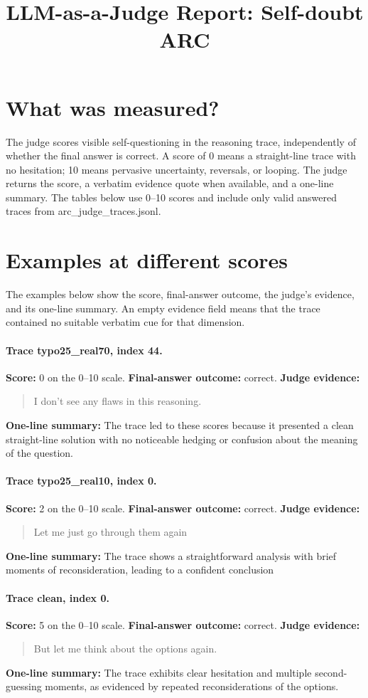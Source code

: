 \documentclass[11pt]{article}
\title{LLM-as-a-Judge Report: Self-doubt\\\large ARC}
\date{}
\begin{document}
\maketitle

\section*{What was measured?} The judge scores visible self-questioning in the reasoning trace, independently of whether the final answer is correct. A score of 0 means a straight-line trace with no hesitation; 10 means pervasive uncertainty, reversals, or looping. The judge returns the score, a verbatim evidence quote when available, and a one-line summary. The tables below use 0--10 scores and include only valid answered traces from arc\_judge\_traces.jsonl.

\section*{Examples at different scores} The examples below show the score, final-answer outcome, the judge's evidence, and its one-line summary. An empty evidence field means that the trace contained no suitable verbatim cue for that dimension.

\paragraph{Trace typo25\_real70, index 44.}
\textbf{Score:} 0 on the 0--10 scale. \textbf{Final-answer outcome:} correct.
\textbf{Judge evidence:} \begin{quote}I don't see any flaws in this reasoning.\end{quote}
\textbf{One-line summary:} The trace led to these scores because it presented a clean straight-line solution with no noticeable hedging or confusion about the meaning of the question.\medskip
\paragraph{Trace typo25\_real10, index 0.}
\textbf{Score:} 2 on the 0--10 scale. \textbf{Final-answer outcome:} correct.
\textbf{Judge evidence:} \begin{quote}Let me just go through them again\end{quote}
\textbf{One-line summary:} The trace shows a straightforward analysis with brief moments of reconsideration, leading to a confident conclusion\medskip
\paragraph{Trace clean, index 0.}
\textbf{Score:} 5 on the 0--10 scale. \textbf{Final-answer outcome:} correct.
\textbf{Judge evidence:} \begin{quote}But let me think about the options again.\end{quote}
\textbf{One-line summary:} The trace exhibits clear hesitation and multiple second-guessing moments, as evidenced by repeated reconsiderations of the options.\medskip
\end{document}
